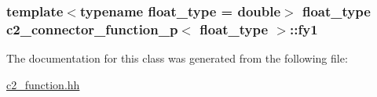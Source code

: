 \subsubsection[{\texorpdfstring{fy1}{fy1}}]{\setlength{\rightskip}{0pt plus 5cm}template$<$typename float\+\_\+type = double$>$ float\+\_\+type {\bf c2\+\_\+connector\+\_\+function\+\_\+p}$<$ float\+\_\+type $>$\+::fy1\hspace{0.3cm}{\ttfamily [protected]}}\hypertarget{classc2__connector__function__p_a1e6f14a7d716a5915adf1985bbdc4c52}{}\label{classc2__connector__function__p_a1e6f14a7d716a5915adf1985bbdc4c52}


The documentation for this class was generated from the following file\+:\begin{DoxyCompactItemize}
\item 
\hyperlink{c2__function_8hh}{c2\+\_\+function.\+hh}\end{DoxyCompactItemize}
